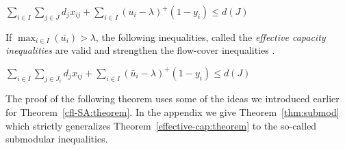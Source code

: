 \documentclass[11pt]{article}
\begin{document}
\vspace*{-0.1cm}
\begin{center}
$\sum_{i\in I}\sum_{j\in J}d_jx_{ij} +\sum_{i\in I}({u}_i-\lambda)^+(1-y_i)\leq d(J)$
\end{center}
\vspace*{-0.2cm}

\begin{comment}
For the families of instances that we consider with uniform capacities and unit client demands, the above inequalities are simplified to:
\begin{center}
$\sum_{i\in J}\sum_{j\in K}x_{ij} +\sum_{i\in I}(U-\lambda)^+(1-y_i)\leq |K|$
\end{center}
\end{comment}

If $\max_{i\in I} (\bar{u_i}) > \lambda$, the following inequalities,
called the {\em effective capacity inequalities} are  valid and strengthen the flow-cover inequalities \cite{AardalPW95}.
\begin{center}
$\sum_{i\in I}\sum_{j\in J_i}d_jx_{ij}  + \sum_{i\in I}(\bar{u}_i-\lambda )^+(1-y_i)\leq d(J)$ 
\end{center}
\vspace*{-0.3cm}
The proof of the following theorem uses some of the ideas we introduced
earlier for Theorem~\ref{cfl-SA:theorem}. In the appendix we give
Theorem~\ref{thm:submod} which strictly 
generalizes 
Theorem~\ref{effective-cap:theorem} 
to the  so-called submodular inequalities. 
\end{document}
